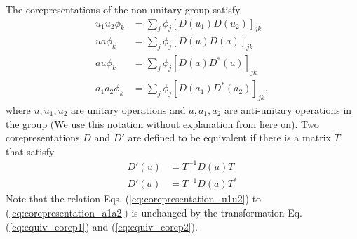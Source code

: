 \documentclass{article}
\begin{document}
The corepresentations of the non-unitary group satisfy
\begin{align}
  u_1 u_2 \phi_k &= \sum_j \phi_j [D(u_1) D(u_2)]_{jk}
  \label{eq:corepresentation_u1u2}
  \\
  u a \phi_k &= \sum_j \phi_j [D(u) D(a)]_{jk}
  \label{eq:corepresentation_ua}
  \\
  au \phi_k &= \sum_j \phi_j [D(a) D^*(u)]_{jk}
  \label{eq:corepresentation_au}
  \\
  a_1 a_2 \phi_k &= \sum_j \phi_j [D(a_1) D^*(a_2)]_{jk},
  \label{eq:corepresentation_a1a2}
\end{align}
where $u, u_1, u_2$ are unitary operations and $a, a_1, a_2$ are anti-unitary operations in the group (We use this notation without explanation from here on).
Two corepresentations $D$ and $D'$ are defined to be equivalent if there is a matrix $T$ that satisfy
\begin{align}
  D'(u) &= T^{-1} D(u) T
  \label{eq:equiv_corep1}
  \\
  D'(a) &= T^{-1} D(a) T^*
  \label{eq:equiv_corep2}
\end{align}
Note that the relation Eqs. (\ref{eq:corepresentation_u1u2}) to (\ref{eq:corepresentation_a1a2}) is unchanged by the transformation Eq. (\ref{eq:equiv_corep1}) and (\ref{eq:equiv_corep2}).







\end{document}
